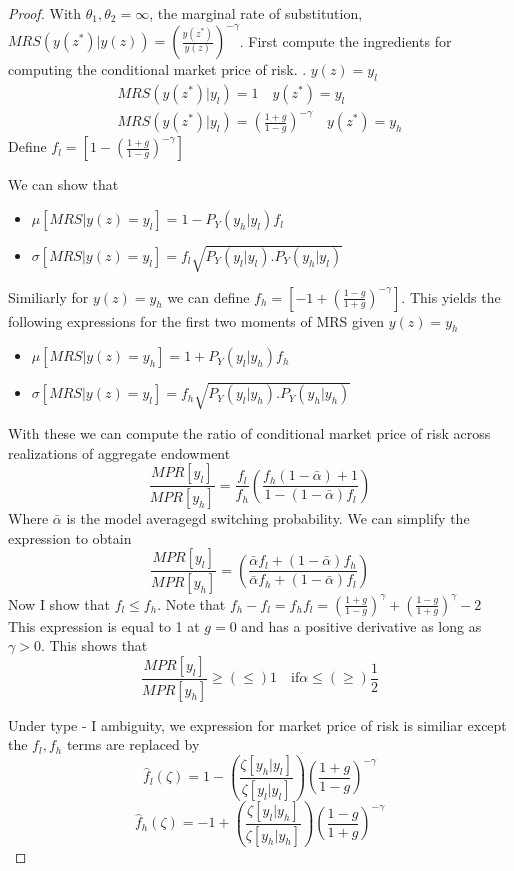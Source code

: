\documentclass[12pt]{article}
\begin{document}
 \begin{proof}
With $\theta_1,\theta_2=\infty$, the marginal rate of substitution, $MRS(y(z^*)|y(z)) = \left(\frac{y(z^*)}{y(z)}\right)^{-\gamma}$. First compute the ingredients for computing the conditional market price of risk.
. $y(z)=y_l$
\begin{align}
MRS(y(z^*)| y_l)=1 \quad y(z^*)=y_l \\
MRS(y(z^*)| y_l)=\left(\frac{1+g}{1-g}\right)^{-\gamma} \quad y(z^*)=y_h 
\end{align}
Define $f_l=\left[1-\left ( \frac{1+g}{1-g}\right)^{-\gamma}\right]$

We can show that 
\begin{itemize}
	\item $\mu[MRS|y(z)=y_l]= 1-P_Y(y_h|y_l)f_l$
	\item $\sigma[MRS|y(z)=y_l] =f_l \sqrt{P_Y(y_l|y_l).P_Y(y_h|y_l)}$
\end{itemize}
Similiarly for $y(z)=y_h$ we can define $f_h=\left[-1+\left ( \frac{1-g}{1+g}\right)^{-\gamma}\right]$. 
This yields the following expressions for the first two moments of MRS given $y(z)=y_h$
\begin{itemize}
	\item $\mu[MRS|y(z)=y_h]= 1+P_Y(y_l|y_h)f_h$
	\item $\sigma[MRS|y(z)=y_l] =f_h \sqrt{P_Y(y_l|y_h).P_Y(y_h|y_h)}$
\end{itemize}
With these we can compute the ratio of conditional market price of risk across realizations of aggregate endowment
\begin{equation}
\frac{MPR[y_l]}{MPR[y_h]}=\frac{f_l}{f_h} \left(\frac{f_h(1-\bar{\alpha})+1}{1-(1-\bar{\alpha})f_l}\right)
\end{equation}
Where $\bar{\alpha}$ is the model averagegd switching probability. We can simplify the expression to obtain
\begin{equation}
\frac{MPR[y_l]}{MPR[y_h]}=\left(\frac{\bar{\alpha}f_l+(1-\bar{\alpha})f_h}{\bar{\alpha}f_h+(1-\bar{\alpha})f_l}\right)
\end{equation}
Now I show that $f_l\leq f_h$. Note that $f_h-f_l=f_h f_l= \left ( \frac{1+g}{1-g}\right)^{\gamma} + \left ( \frac{1-g}{1+g}\right)^{\gamma}-2$
This expression is equal to 1 at $g=0$ and has a positive derivative as long as $\gamma>0$. This shows that
\[\frac{MPR[y_l]}{MPR[y_h]} \geq  (\leq) 1 \quad \text{if} \alpha \leq (\geq)\frac{1}{2}\]

Under type - I ambiguity, we expression for market price of risk is similiar except the $f_l,f_h$ terms are replaced by 
\[\hat{f} _l(\zeta) = 1-\left(\frac{\zeta[y_h|y_l]}{\zeta[y_l|y_l]}\right) \left ( \frac{1+g}{1-g}\right)^{-\gamma}\]
\[\hat{f} _h(\zeta) = -1+\left(\frac{\zeta[y_l|y_h]}{\zeta[y_h|y_h]}\right) \left ( \frac{1-g}{1+g}\right)^{-\gamma}\]


\end{proof}
\end{document}
